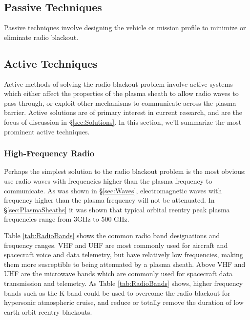 \documentclass[twocolumn]{article}
\begin{document}
\subsection*{Passive Techniques}
	Passive techniques involve designing the vehicle or mission profile to minimize or eliminate radio blackout.
\subsection*{Active Techniques}
	Active methods of solving the radio blackout problem involve active systems which either affect the properties of the plasma sheath to allow radio waves to pass through, or exploit other mechanisms to communicate across the plasma barrier.
	Active solutions are of primary interest in current research, and are the focus of discussion in \S\ref{sec:Solutions}.
	In this section, we'll summarize the most prominent active techniques.
	
	\subsubsection*{High-Frequency Radio}
	Perhaps the simplest solution to the radio blackout problem is the most obvious: use radio waves with frequencies higher than the plasma frequency to communicate.
	As was shown in \S\ref{sec:Waves}, electromagnetic waves with frequency higher than the plasma frequency will not be attenuated.
	In \S\ref{sec:PlasmaSheaths} it was shown that typical orbital reentry peak plasma frequencies range from 3GHz to 500 GHz.
	
	Table \ref{tab:RadioBands} shows the common radio band designations and frequency ranges.
	VHF and UHF are most commonly used for aircraft and spacecraft voice and data telemetry, but have relatively low frequencies, making them more susceptible to being attenuated by a plasma sheath.
	Above VHF and UHF are the microwave bands which are commonly used for spacecraft data transmission and telemetry.
	As Table \ref{tab:RadioBands} shows, higher frequency bands such as the K band could be used to overcome the radio blackout for hypersonic atmospheric cruise, and reduce or totally remove the duration of low earth orbit reentry blackouts.
	
\end{document}
